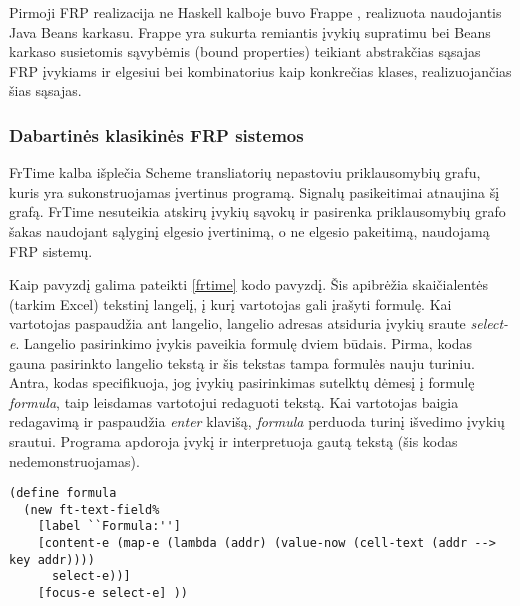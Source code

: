 Pirmoji FRP realizacija ne Haskell kalboje buvo Frappe \cite{Courtney:2001:FFR:645771.667929}, realizuota naudojantis Java Beans karkasu. Frappe yra sukurta remiantis įvykių supratimu bei Beans karkaso susietomis sąvybėmis (bound properties) teikiant abstrakčias sąsajas FRP įvykiams ir elgesiui bei kombinatorius kaip konkrečias klases, realizuojančias šias sąsajas. 

\subsubsection{Dabartinės klasikinės FRP sistemos}

FrTime \cite{Ignatoff:2006:CSL:2100071.2100097} kalba išplečia Scheme transliatorių nepastoviu priklausomybių grafu, kuris yra sukonstruojamas įvertinus programą. Signalų pasikeitimai atnaujina šį grafą. FrTime nesuteikia atskirų įvykių sąvokų ir pasirenka priklausomybių grafo šakas naudojant sąlyginį elgesio įvertinimą, o ne elgesio pakeitimą, naudojamą FRP sistemų.

Kaip pavyzdį galima pateikti \ref{frtime} kodo pavyzdį. Šis apibrėžia skaičialentės (tarkim Excel) tekstinį langelį, į kurį vartotojas gali įrašyti formulę. Kai vartotojas paspaudžia ant langelio, langelio adresas atsiduria įvykių sraute \textit{select-e}. Langelio pasirinkimo įvykis paveikia formulę dviem būdais. Pirma, kodas gauna pasirinkto langelio tekstą ir šis tekstas tampa formulės nauju turiniu. Antra, kodas specifikuoja, jog įvykių pasirinkimas sutelktų dėmesį į formulę \textit{formula}, taip leisdamas vartotojui redaguoti tekstą. Kai vartotojas baigia redagavimą ir paspaudžia \textit{enter} klavišą, \textit{formula} perduoda turinį išvedimo įvykių srautui. Programa apdoroja įvykį ir interpretuoja gautą tekstą (šis kodas nedemonstruojamas).

\begin{lstlisting}[caption=- skaičialentės langelio formulė (FrTime), label=frtime]
(define formula
  (new ft-text-field%
    [label ``Formula:'']
	[content-e (map-e (lambda (addr) (value-now (cell-text (addr --> key addr))))
	  select-e))]
	[focus-e select-e] ))
\end{lstlisting}


